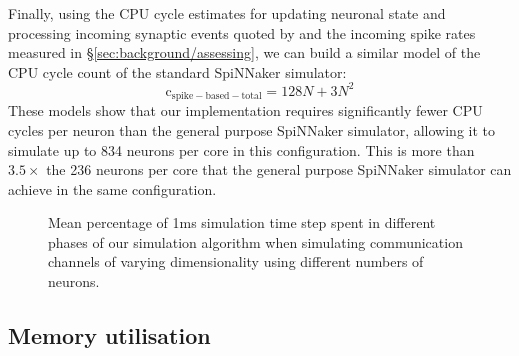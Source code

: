 \documentclass[conference]{IEEEtran}
\begin{document}
%
Finally, using the CPU cycle estimates for updating neuronal state and processing incoming synaptic events quoted by \textcite{Sharp2013} and the incoming spike rates measured in \S\ref{sec:background/assessing}, we can build a similar model of the CPU cycle count of the standard SpiNNaker simulator:
%
\begin{equation}
  \mathrm{c}_\mathrm{spike-based-total} = 128N + 3 N^{2}\label{eq:profiling_spike_based_total}
\end{equation}
% 
These models show that our implementation requires significantly fewer CPU cycles per neuron than the general purpose SpiNNaker simulator, allowing it to simulate up to 834 neurons per core in this configuration. 
This is more than $3.5 \times$ the 236 neurons per core that the general purpose SpiNNaker simulator can achieve in the same configuration.


  \begin{figure}[!t]
    \centering
    \hfil
    \caption{Mean percentage of 1ms simulation time step spent in different phases of our simulation algorithm when simulating communication channels of varying dimensionality using different numbers of neurons.}
    \label{fig:results/comm-channel-cpu}
  \end{figure}

  \subsection{Memory utilisation}
\end{document}
